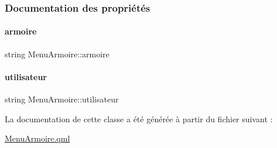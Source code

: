 \subsubsection{Documentation des propriétés}
\mbox{\label{class_menu_armoire_aae5bb1f150da3b193d8e0d15038d708e}} 
\paragraph{\texorpdfstring{armoire}{armoire}}
{\footnotesize\ttfamily string Menu\+Armoire\+::armoire}

\mbox{\label{class_menu_armoire_a6f03b3bcf08a6beeea294af5848f14bc}} 
\paragraph{\texorpdfstring{utilisateur}{utilisateur}}
{\footnotesize\ttfamily string Menu\+Armoire\+::utilisateur}



La documentation de cette classe a été générée à partir du fichier suivant \+:\begin{DoxyCompactItemize}
\item 
\hyperlink{_menu_armoire_8qml}{Menu\+Armoire.\+qml}\end{DoxyCompactItemize}
